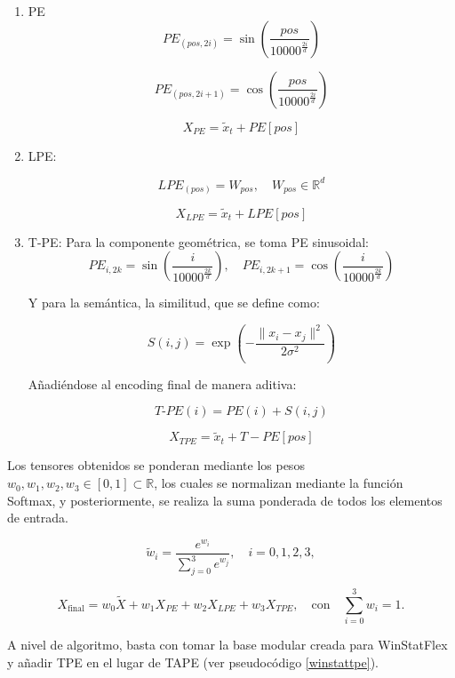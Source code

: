 \begin{enumerate}
	\item PE
	$$
	PE_{(pos, 2i)} = \sin\left(\frac{pos}{10000^{\frac{2i}{d}}}\right)
	$$
	
	$$
	PE_{(pos, 2i+1)} = \cos\left(\frac{pos}{10000^{\frac{2i}{d}}}\right)
	$$
	
	$$
	X_{PE} = \tilde{x}_t + PE[pos]
	$$
	\item LPE:
	
	$$
	LPE_{(pos)} = W_{pos}, \quad W_{pos} \in \mathbb{R}^d
	$$
	
	$$
	X_{LPE} = \tilde{x}_t + LPE[pos]
	$$
	
	\item T-PE:
	Para la componente geométrica, se toma PE sinusoidal:
	\begin{equation}
		PE_{i, 2k} = \sin\left(\frac{i}{10000^{\frac{2k}{d}}}\right), \quad
		PE_{i, 2k+1} = \cos\left(\frac{i}{10000^{\frac{2k}{d}}}\right)
	\end{equation}
	
	Y para la semántica, la similitud, que se define como:
	
	$$S(i, j) = \exp\left( -\frac{\|x_i - x_j\|^2}{2\sigma^2} \right)$$
	
	Añadiéndose al encoding final de manera aditiva:
	
	$$T\text{-}PE(i) = PE(i) + S(i, j)$$
	
	$$
	X_{TPE} = \tilde{x}_t + T-PE[pos]
	$$
	
\end{enumerate}

Los tensores obtenidos se ponderan mediante los pesos $w_0, w_1, w_2, w_3 \in [0,1] \subset \mathbb{R}$, los cuales se normalizan mediante la función Softmax, y posteriormente, se realiza la suma ponderada de todos los elementos de entrada.

\[
\tilde{w}_i = \frac{e^{w_i}}{\sum_{j=0}^3 e^{w_j}}, \quad i = 0,1,2,3,
\]

\[
X_{\text{final}} = w_0 \tilde{X} + w_1 X_{PE} + w_2 X_{LPE} + w_3 X_{TPE}, \quad \text{con} \quad \sum_{i=0}^3 w_i = 1.
\]

A nivel de algoritmo, basta con tomar la base modular creada para WinStatFlex y añadir TPE en el lugar de TAPE (ver pseudocódigo \ref{winstattpe}).



